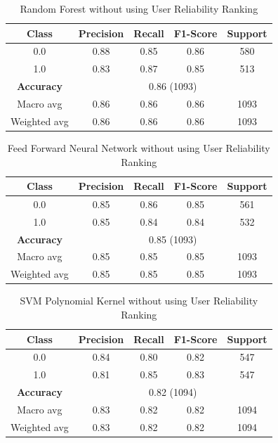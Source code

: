 \documentclass[11pt,a4paper]{article}
\begin{document}
\begin{table}[ht]
\centering
\begin{tabular}{|c|c|c|c|c|}
\hline
Class & Precision & Recall & F1-Score & Support \\
\hline
0.0    & 0.88      & 0.85   & 0.86     & 580     \\
1.0    & 0.83      & 0.87   & 0.85     & 513     \\
\hline
\textbf{Accuracy}   & \multicolumn{4}{c|}{0.86 (1093)} \\
\hline
Macro avg           & 0.86      & 0.86   & 0.86     & 1093    \\
Weighted avg        & 0.86      & 0.86   & 0.86     & 1093    \\
\hline
\end{tabular}
\caption{Random Forest without using User Reliability Ranking}
\end{table}

\begin{table}[ht]
\centering
\begin{tabular}{|c|c|c|c|c|}
\hline
Class & Precision & Recall & F1-Score & Support \\
\hline
0.0    & 0.85      & 0.86   & 0.85     & 561     \\
1.0    & 0.85      & 0.84   & 0.84     & 532     \\
\hline
\textbf{Accuracy}   & \multicolumn{4}{c|}{0.85 (1093)} \\
\hline
Macro avg           & 0.85      & 0.85   & 0.85     & 1093    \\
Weighted avg        & 0.85      & 0.85   & 0.85     & 1093    \\
\hline
\end{tabular}
\caption{Feed Forward Neural Network without using User Reliability Ranking}
\end{table}


\begin{table}[ht]
\centering
\begin{tabular}{|c|c|c|c|c|}
\hline
Class & Precision & Recall & F1-Score & Support \\
\hline
0.0    & 0.84      & 0.80   & 0.82     & 547     \\
1.0    & 0.81      & 0.85   & 0.83     & 547     \\
\hline
\textbf{Accuracy}   & \multicolumn{4}{c|}{0.82 (1094)} \\
\hline
Macro avg           & 0.83      & 0.82   & 0.82     & 1094    \\
Weighted avg        & 0.83      & 0.82   & 0.82     & 1094    \\
\hline
\end{tabular}
\caption{SVM Polynomial Kernel without using User Reliability Ranking}
\end{table}
\end{document}

